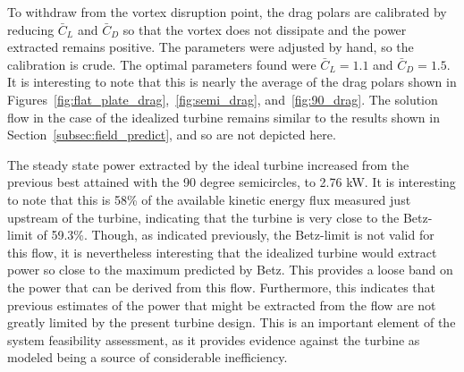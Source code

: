
To withdraw from the vortex disruption point, the drag
polars are calibrated by reducing $\bar C_L $ and $\bar C_D$ so that the 
vortex does not dissipate and the power extracted remains positive. The
parameters were adjusted by hand, so the calibration is crude. The
optimal parameters found were $\bar C_L = 1.1$ and $\bar C_D = 1.5$. It
is interesting to note that this is nearly the average of the drag
polars shown in Figures~\ref{fig:flat_plate_drag},~\ref{fig:semi_drag}, 
and~\ref{fig:90_drag}. The solution flow in the case of the idealized
turbine remains similar to the results shown in
Section~\ref{subsec:field_predict}, and so are not depicted here. 

The steady state power extracted by the ideal turbine 
increased from the previous best attained with the 90 degree
semicircles, to 2.76 kW. It is interesting to note that this is 58\% of
the available kinetic energy flux measured just upstream of the turbine,
indicating that the turbine is very close to the Betz-limit of
59.3\%. Though, as indicated previously, the Betz-limit is not valid for
this flow, it is nevertheless interesting that the idealized turbine
would extract power so close to the maximum predicted by Betz. This
provides a loose band on the power that can be derived from this
flow. Furthermore, this indicates that previous estimates of the power
that might be extracted from the flow are not greatly limited by the
present turbine design. This is an important element of the system
feasibility assessment, as it provides evidence against the turbine as
modeled being a source of considerable inefficiency.   



